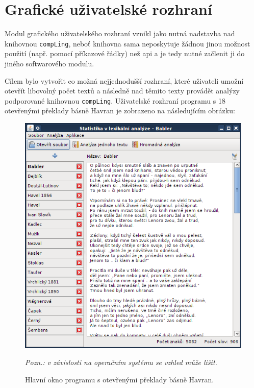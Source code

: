 \documentclass[dp.tex]{subfiles}
\begin{document}
\section{Grafické uživatelské rozhraní}

Modul grafického uživatelského rozhraní vznikl jako nutná nadstavba nad knihovnou \texttt{compLing}, neboť knihovna sama neposkytuje žádnou jinou možnost použití (např. pomocí příkazové řádky) než \acrshort{api} a je tedy nutné začlenit ji do jiného softwarového modulu.

Cílem bylo vytvořit co možná nejjednodušší rozhraní, které uživateli umožní otevřít libovolný počet textů a následně nad těmito texty provádět analýzy podporované knihovnou \texttt{compLing}. Uživatelské rozhraní programu s 18 otevřenými překlady básně Havran je zobrazeno na následujícím obrázku:

\begin{figure}[H]
	\centering
	\includegraphics[max width=\textwidth,keepaspectratio=true] {imgs-60-aplikace/gui-main-window}
	\caption{Hlavní okno programu s otevřenými překlady básně Havran.}

	\medskip %
	\begin{minipage}{\textwidth} %
		\begin{center}
			{\footnotesize \textit{Pozn.: v závislosti na operačním systému se vzhled může lišit.}\par}
		\end{center}
	\end{minipage}
		
	\label{fig:gui-main-window}
\end{figure}
\end{document}
